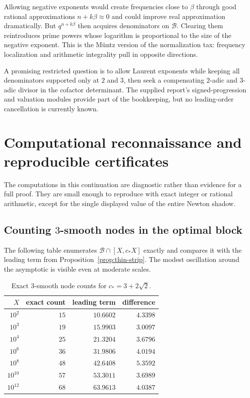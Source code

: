 \documentclass[11pt,oneside]{article}
\theoremstyle{definition}
\theoremstyle{remark}
\newcommand{\Bsem}{\mathcal B}
\begin{document}
Allowing negative exponents would create frequencies close to $\beta$ through good rational
approximations $n+k\beta\approx0$ and could improve real approximation dramatically.  But
$q^{n+k\beta}$ then acquires denominators on $\Bsem$.  Clearing them reintroduces prime powers
whose logarithm is proportional to the size of the negative exponent.  This is the M\"untz
version of the normalization tax: frequency localization and arithmetic integrality pull in
opposite directions.

A promising restricted question is to allow Laurent exponents while keeping all denominators
supported only at $2$ and $3$, then seek a compensating $2$-adic and $3$-adic divisor in the
cofactor determinant.  The supplied report's signed-progression and valuation modules provide
part of the bookkeeping, but no leading-order cancellation is currently known.


\section{Computational reconnaissance and reproducible certificates}
\label{sec:computation}

The computations in this continuation are diagnostic rather than evidence for a full proof.
They are small enough to reproduce with exact integer or rational arithmetic, except for the
single displayed value of the entire Newton shadow.

\subsection{Counting $3$-smooth nodes in the optimal block}

The following table enumerates $\Bsem\cap[X,c_*X]$ exactly and compares it with the leading
term from Proposition~\ref{prop:thin-strip}.  The modest oscillation around the asymptotic is
visible even at moderate scales.

\begin{table}[ht]
\centering
\small
\begin{tabular}{r@{\qquad}r@{\qquad}r@{\qquad}r}
\toprule
$X$ & exact count & leading term & difference \\
\midrule
$10^2$  & $15$ & $10.6602$ & $4.3398$ \\
$10^3$  & $19$ & $15.9903$ & $3.0097$ \\
$10^4$  & $25$ & $21.3204$ & $3.6796$ \\
$10^6$  & $36$ & $31.9806$ & $4.0194$ \\
$10^8$  & $48$ & $42.6408$ & $5.3592$ \\
$10^{10}$ & $57$ & $53.3011$ & $3.6989$ \\
$10^{12}$ & $68$ & $63.9613$ & $4.0387$ \\
\bottomrule
\end{tabular}
\caption{Exact $3$-smooth node counts for $c_*=3+2\sqrt2$.}
\label{tab:node-counts}
\end{table}
\end{document}
